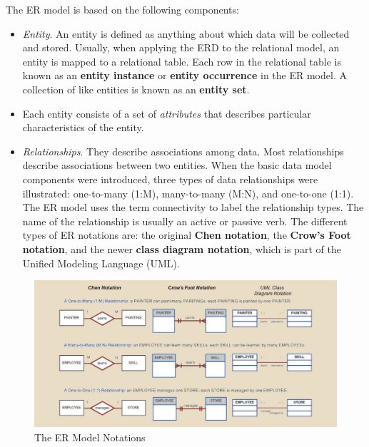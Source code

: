 \documentclass[a4paper, 12pt, titlepage]{report}
\begin{document}
The ER model is based on the following components:
\begin{itemize}
\item \emph{Entity}. An entity is defined as anything about which data will be collected and stored. Usually, when applying the ERD to the relational model, an entity is mapped to a relational table. Each row in the relational table is known as an \textbf{entity instance} or \textbf{entity occurrence} in the ER model. A collection of like entities is known as an \textbf{entity set}.
\item Each entity consists of a set of \emph{attributes} that describes particular characteristics of the entity.
\item \emph{Relationships}. They describe associations among data. Most relationships describe associations between two entities. When the basic data model components were introduced, three types of data relationships were illustrated: one-to-many (1:M), many-to-many (M:N), and one-to-one (1:1). The ER model uses the term connectivity to label the relationship types. The name of the relationship is usually an active or passive verb. The different types of ER notations are: the original \textbf{Chen notation}, the \textbf{Crow’s Foot notation}, and the newer \textbf{class diagram notation}, which is part of the Unified Modeling Language (UML).
\end{itemize}
\begin{figure}[H]
\centering
\includegraphics[scale=0.3]{ERNot}
\caption{The ER Model Notations}
\end{figure}
\end{document}

